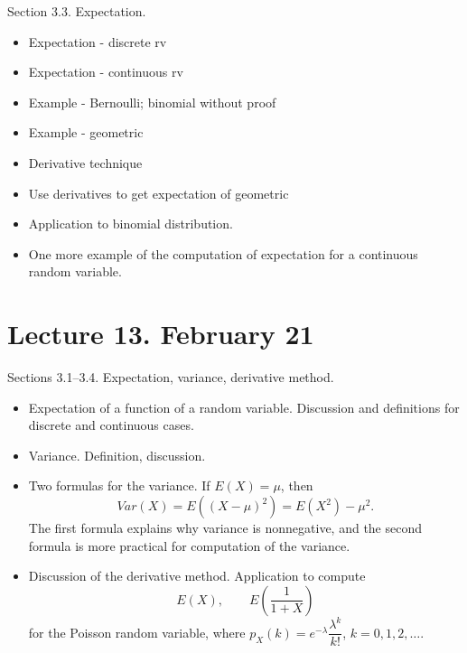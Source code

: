 \documentclass[letterpaper,11pt,oneside,reqno]{amsart}
\numberwithin{equation}{section}
\theoremstyle{definition}
\begin{document}
Section 3.3. Expectation.

\begin{itemize}
	\item 
Expectation - discrete rv

\item 
Expectation - continuous rv
\item 
Example - Bernoulli; binomial without proof
\item 
Example - geometric
\item 
Derivative technique
\item 
Use derivatives to get expectation of geometric
\item 
	Application to binomial distribution.
\item One more example of the computation of expectation for a continuous random variable.
\end{itemize}

\section*{Lecture 13. February 21}

Sections 3.1--3.4. Expectation, variance, derivative method.
\begin{itemize}
	\item Expectation of a function of a random variable. Discussion and definitions for 
		discrete and continuous cases.
	\item Variance. Definition, discussion. 
	\item Two formulas for the variance. If $E(X)=\mu$, then
		\begin{equation*}
			Var(X)=E\left( (X-\mu)^2 \right)=E\left( X^2 \right)-\mu^2.
		\end{equation*}
		The first formula explains why variance is nonnegative, and the 
		second formula is more practical for computation of the variance. 
	\item Discussion of the derivative method. Application to compute
		\begin{equation*}
			E(X),\qquad E\left( \frac{1}{1+X} \right)
		\end{equation*}
		for the Poisson random variable, where $p_X(k)=e^{-\lambda}\dfrac{\lambda^k}{k!}$, $k=0,1,2,\ldots $.
\end{itemize}
\end{document}

